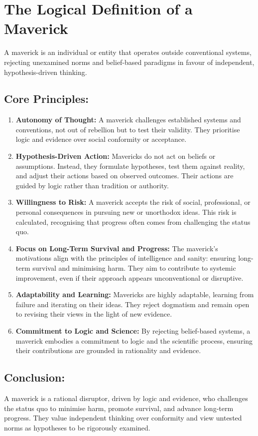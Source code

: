 \documentclass[12pt,a4paper]{article}
\begin{document}
\section*{The Logical Definition of a Maverick}
A maverick is an individual or entity that operates outside conventional systems, rejecting unexamined norms and belief-based paradigms in favour of independent, hypothesis-driven thinking.

\subsection*{Core Principles:}
\begin{enumerate}
    \item \textbf{Autonomy of Thought:} A maverick challenges established systems and conventions, not out of rebellion but to test their validity. They prioritise logic and evidence over social conformity or acceptance.
    \item \textbf{Hypothesis-Driven Action:} Mavericks do not act on beliefs or assumptions. Instead, they formulate hypotheses, test them against reality, and adjust their actions based on observed outcomes. Their actions are guided by logic rather than tradition or authority.
    \item \textbf{Willingness to Risk:} A maverick accepts the risk of social, professional, or personal consequences in pursuing new or unorthodox ideas. This risk is calculated, recognising that progress often comes from challenging the status quo.
    \item \textbf{Focus on Long-Term Survival and Progress:} The maverick’s motivations align with the principles of intelligence and sanity: ensuring long-term survival and minimising harm. They aim to contribute to systemic improvement, even if their approach appears unconventional or disruptive.
    \item \textbf{Adaptability and Learning:} Mavericks are highly adaptable, learning from failure and iterating on their ideas. They reject dogmatism and remain open to revising their views in the light of new evidence.
    \item \textbf{Commitment to Logic and Science:} By rejecting belief-based systems, a maverick embodies a commitment to logic and the scientific process, ensuring their contributions are grounded in rationality and evidence.
\end{enumerate}

\subsection*{Conclusion:}
A maverick is a rational disruptor, driven by logic and evidence, who challenges the status quo to minimise harm, promote survival, and advance long-term progress. They value independent thinking over conformity and view untested norms as hypotheses to be rigorously examined.
\end{document}
